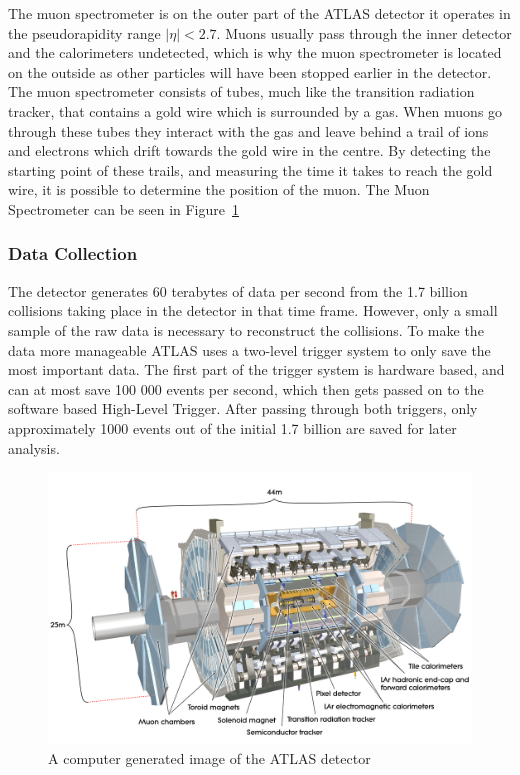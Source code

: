 \documentclass[12pt,a4paper]{article}
\numberwithin{equation}{section}
\begin{document}
The muon spectrometer is on the outer part of the ATLAS detector it operates in
the pseudorapidity range $|\eta| < 2.7$. Muons usually pass through the inner
detector and the calorimeters undetected, which is why the muon spectrometer is
located on the outside as other particles will have been stopped earlier in the
detector. The muon spectrometer consists of tubes, much like the transition
radiation tracker, that contains a gold wire which is surrounded by a gas. When
muons go through these tubes they interact with the gas and leave behind a trail
of ions and electrons which drift towards the gold wire in the centre. By
detecting the starting point of these trails, and measuring the time it takes to
reach the gold wire, it is possible to determine the position of the muon. The
Muon Spectrometer can be seen in Figure~\ref{fig:detector} \cite{ATLAS-Muon}


\subsubsection{Data Collection}
The detector generates 60 terabytes of data per second from the 1.7 billion
collisions taking place in the detector in that time frame. However, only a
small sample of the raw data is necessary to reconstruct the collisions. To make
the data more manageable ATLAS uses a two-level trigger system to only save the
most important data. The first part of the trigger system is hardware based, and
can at most save 100 000 events per second, which then gets passed on to the
software based High-Level Trigger. After passing through both triggers, only
approximately 1000 events out of the initial 1.7 billion are saved for later
analysis.\cite{ATLAS-trig}

\begin{figure}[H]
	\centering
	\includegraphics[scale=0.1]{figures/atlas.jpg}
	\caption{A computer generated image of the ATLAS detector~\cite{detector}}\label{fig:detector}
\end{figure}
\end{document}
